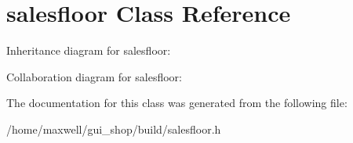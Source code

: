 \hypertarget{classsalesfloor}{}\section{salesfloor Class Reference}
\label{classsalesfloor}


Inheritance diagram for salesfloor\+:


Collaboration diagram for salesfloor\+:


The documentation for this class was generated from the following file\+:\begin{DoxyCompactItemize}
\item 
/home/maxwell/gui\+\_\+shop/build/salesfloor.\+h\end{DoxyCompactItemize}
